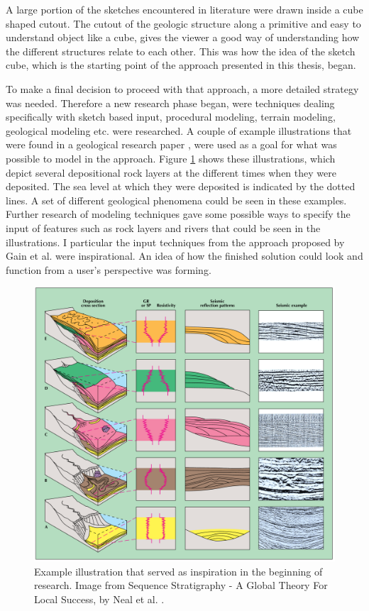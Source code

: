 \documentclass[a4paper,12pt]{report}
\begin{document}
A large portion of the sketches encountered in literature were drawn inside a cube shaped cutout. The cutout of the geologic structure along a primitive and easy to understand object like a cube, gives the viewer a good way of understanding how the different structures relate to each other. This was how the idea of the sketch cube, which is the starting point of the approach presented in this thesis, began.

To make a final decision to proceed with that approach, a more detailed strategy was needed. Therefore a new research phase began, were techniques dealing specifically with sketch based input, procedural modeling, terrain modeling, geological modeling etc. were researched. A couple of example illustrations that were found in a geological research paper \cite{neal1993sequence}, were used as a goal for what was  possible to model in the approach. Figure \ref{fig:inspiration1} shows these illustrations, which depict several depositional rock layers at the different times when they were deposited. The sea level at which they were deposited is indicated by the dotted lines. A set of different geological phenomena could be seen in these examples. Further research of modeling techniques gave some possible ways to specify the input of features such as rock layers and rivers that could be seen in the illustrations. I particular the input techniques from the approach proposed by Gain et al.\cite{Gain:2009:TS:1507149.
1507155} were inspirational. An idea of how the finished solution could look and function from a user's perspective was forming.

\begin{figure}
 \includegraphics[width=\linewidth]{thesis/inspiration1.png}
 \caption{Example illustration that served as inspiration in the beginning of research. Image from Sequence Stratigraphy - A Global Theory For Local Success, by Neal et al. \cite{neal1993sequence}.}
 \label{fig:inspiration1}
\end{figure}
\end{document}
